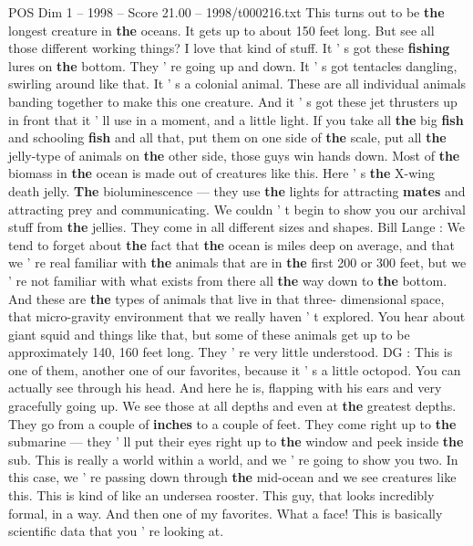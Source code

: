 \begin{textsample}{POS Dim 1 – 1998 – Score 21.00 – 1998/t000216.txt}
This turns out to be \textbf{the} longest creature in \textbf{the} oceans.
It gets up to about 150 feet long.
But see all those different working things?
I love that kind of stuff.
It ' s got these \textbf{fishing} lures on \textbf{the} bottom.
They ' re going up and down.
It ' s got tentacles dangling, swirling around like that.
It ' s a colonial animal.
These are all individual animals banding together to make this one creature.
And it ' s got these jet thrusters up in front that it ' ll use in a moment, and a little light.
If you take all \textbf{the} big \textbf{fish} and schooling \textbf{fish} and all that, put them on one side of \textbf{the} scale, put all \textbf{the} jelly-type of animals on \textbf{the} other side, those guys win hands down.
Most of \textbf{the} biomass in \textbf{the} ocean is made out of creatures like this.
Here ' s \textbf{the} X-wing death jelly. \textbf{The} bioluminescence — they use \textbf{the} lights for attracting \textbf{mates} and attracting prey and communicating.
We couldn ' t begin to show you our archival stuff from \textbf{the} jellies.
They come in all different sizes and shapes.
Bill Lange : We tend to forget about \textbf{the} fact that \textbf{the} ocean is miles deep on average, and that we ' re real familiar with \textbf{the} animals that are in \textbf{the} first 200 or 300 feet, but we ' re not familiar with what exists from there all \textbf{the} way down to \textbf{the} bottom.
And these are \textbf{the} types of animals that live in that three- dimensional space, that micro-gravity environment that we really haven ' t explored.
You hear about giant squid and things like that, but some of these animals get up to be approximately 140, 160 feet long.
They ' re very little understood.
DG : This is one of them, another one of our favorites, because it ' s a little octopod.
You can actually see through his head.
And here he is, flapping with his ears and very gracefully going up.
We see those at all depths and even at \textbf{the} greatest depths.
They go from a couple of \textbf{inches} to a couple of feet.
They come right up to \textbf{the} submarine — they ' ll put their eyes right up to \textbf{the} window and peek inside \textbf{the} sub.
This is really a world within a world, and we ' re going to show you two.
In this case, we ' re passing down through \textbf{the} mid-ocean and we see creatures like this.
This is kind of like an undersea rooster.
This guy, that looks incredibly formal, in a way.
And then one of my favorites.
What a face!
This is basically scientific data that you ' re looking at.

\end{textsample}
